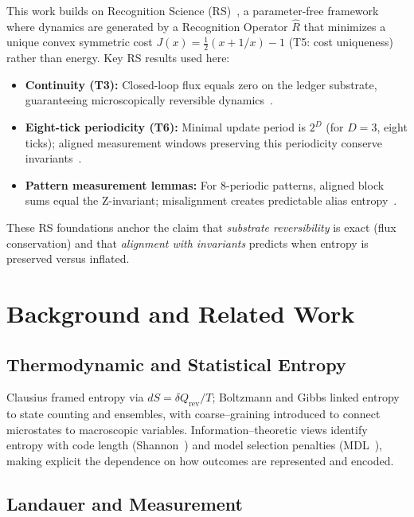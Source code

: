 \documentclass[11pt,letterpaper]{article}
\theoremstyle{definition}
\theoremstyle{remark}
\begin{document}
This work builds on Recognition Science (RS)~\cite{RS_Source}, a parameter-free framework where dynamics are generated by a Recognition Operator \(\widehat{R}\) that minimizes a unique convex symmetric cost \(J(x)=\tfrac{1}{2}(x+1/x)-1\) (T5: cost uniqueness) rather than energy. Key RS results used here:

\begin{itemize}[leftmargin=*]
  \item \textbf{Continuity (T3):} Closed-loop flux equals zero on the ledger substrate, guaranteeing microscopically reversible dynamics~\cite{RS_T3}.
  \item \textbf{Eight-tick periodicity (T6):} Minimal update period is \(2^D\) (for \(D=3\), eight ticks); aligned measurement windows preserving this periodicity conserve invariants~\cite{RS_T6}.
  \item \textbf{Pattern measurement lemmas:} For 8-periodic patterns, aligned block sums equal the Z-invariant; misalignment creates predictable alias entropy~\cite{RS_PatternMeasurement}.
\end{itemize}

\noindent These RS foundations anchor the claim that \emph{substrate reversibility} is exact (flux conservation) and that \emph{alignment with invariants} predicts when entropy is preserved versus inflated.

\section{Background and Related Work}

\subsection{Thermodynamic and Statistical Entropy}

Clausius framed entropy via \(dS = \delta Q_\mathrm{rev}/T\); Boltzmann and Gibbs linked entropy to state counting and ensembles, with coarse--graining introduced to connect microstates to macroscopic variables. Information--theoretic views identify entropy with code length (Shannon~\cite{Shannon1948}) and model selection penalties (MDL~\cite{Rissanen1978}), making explicit the dependence on how outcomes are represented and encoded.

\subsection{Landauer and Measurement}
\end{document}
